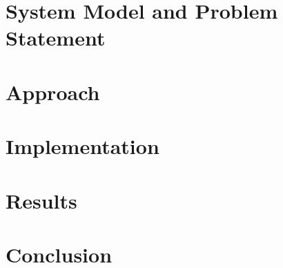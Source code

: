\documentclass[11pt, journal]{IEEEtran}
\begin{document}
\section{System Model and Problem Statement}


\section{Approach}


\section{Implementation}


\section{Results}


\section{Conclusion}

\end{document}
